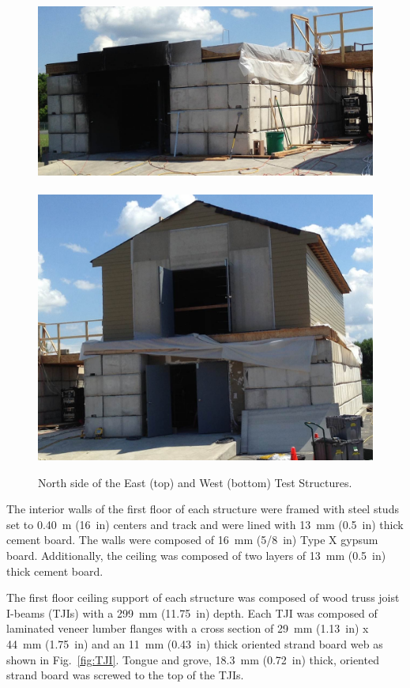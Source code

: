 \documentclass[12pt,oneside]{book}
\begin{document}
\begin{figure}[!ht]
	\includegraphics[width=5.25in]{../Figures/Pictures/east_structure}
	\\~\\
	\includegraphics[width=5.25in]{../Figures/Pictures/west_structure}
	\caption[North side of the East and West Structures.]{North side of the East (top) and West (bottom) Test Structures.}
	\label{fig:struct_pics}
\end{figure}

The interior walls of the first floor of each structure were framed with steel studs set to 0.40~m (16~in) centers and track and were lined with 13~mm (0.5~in) thick cement board. The walls were composed of 16~mm (5/8~in) Type X gypsum board. Additionally, the ceiling was composed of two layers of 13~mm (0.5~in) thick cement board.
\FloatBarrier

The first floor ceiling support of each structure was composed of wood truss joist I-beams (TJIs) with a 299~mm (11.75~in) depth. Each TJI was composed of laminated veneer lumber flanges with a cross section of 29~mm (1.13~in) x 44~mm (1.75~in) and an 11~mm (0.43~in) thick oriented strand board web as shown in Fig.~\ref{fig:TJI}. Tongue and grove, 18.3~mm (0.72~in) thick, oriented strand board was screwed to the top of the TJIs.
\end{document}
